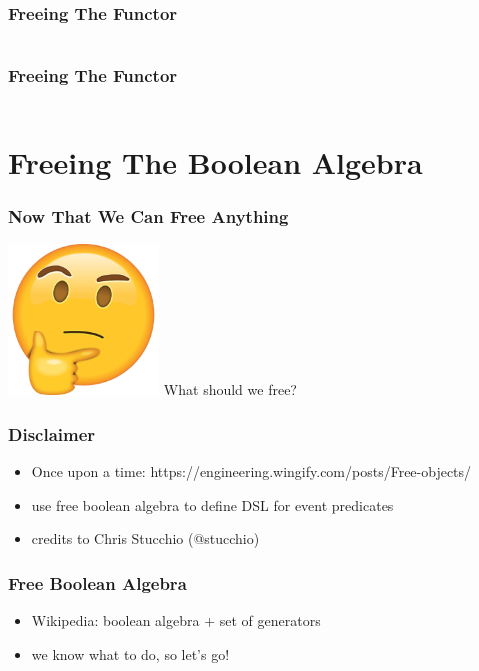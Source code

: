 \documentclass{beamer}
\begin{document}
\begin{frame}[fragile]
  \frametitle{Freeing The Functor}
  \inputminted{scala}{snippets/free-functor3.scala}
\end{frame}

\begin{frame}[fragile]
  \frametitle{Freeing The Functor}
  \inputminted{scala}{snippets/free-functor4.scala}
\end{frame}

\section{Freeing The Boolean Algebra}\label{sec:free-boolean-algebra}

\begin{frame}
  \frametitle{Now That We Can Free Anything}
  \begin{center}
    \includegraphics[width=0.3\textwidth]{static-images/thinking.png}
    \vfill
    \Huge What should we free?
  \end{center}
\end{frame}

\begin{frame}
  \frametitle{Disclaimer}
  \begin{itemize}
  \item Once upon a time: https://engineering.wingify.com/posts/Free-objects/
  \item use free boolean algebra to define DSL for event predicates
  \item credits to Chris Stucchio (@stucchio)
  \end{itemize}
\end{frame}

\begin{frame}
  \frametitle{Free Boolean Algebra}
  \begin{itemize}
  \item Wikipedia: boolean algebra + set of generators
  \item we know what to do, so let's go!
  \end{itemize}
\end{frame}
\end{document}
